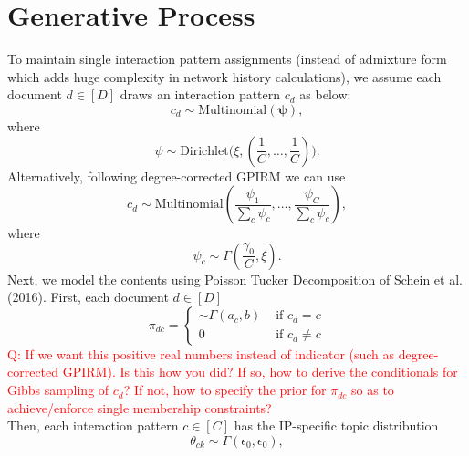 \documentclass[11pt]{article}
\begin{document}
\maketitle


\section{Generative Process}
To maintain single interaction pattern assignments (instead of admixture form which adds huge complexity in network history calculations), we assume each document $d \in [D]$ draws an interaction pattern $c_d$ as below:
\begin{equation}
c_d\sim \mbox{Multinomial}(\boldsymbol{\psi}),
\end{equation}
where 
\begin{equation}
\psi \sim \mbox{Dirichlet}\Big(\xi, (\frac{1}{C},\ldots,\frac{1}{C})\Big).
\end{equation}
Alternatively, following degree-corrected GPIRM we can use
\begin{equation}
c_d\sim \mbox{Multinomial}(\frac{\psi_1}{\sum_c \psi_c},\ldots,\frac{\psi_C}{\sum_c \psi_c}),
\end{equation}
where 
\begin{equation}
\psi_c\sim \Gamma(\frac{\gamma_0}{C}, \xi).
\end{equation}
Next, we model the contents using Poisson Tucker Decomposition of Schein et al. (2016). First, each document $d \in [D]$
\begin{equation}
\pi_{dc}=
\begin{cases}
 \sim \Gamma(a_c, b)&\mbox{ if } c_d = c\\
 0&\mbox{ if } c_d \neq c
\end{cases}
\end{equation}
\textcolor{red}{Q: If we want this positive real numbers instead of indicator (such as degree-corrected GPIRM). Is this how you did? If so, how to derive
	the conditionals for Gibbs sampling of $c_d$? If not, how to specify the prior for $\pi_{dc}$ so as to achieve/enforce single membership constraints? }\\\newline
Then, each interaction pattern $c \in [C]$ has the IP-specific topic distribution
\begin{equation}
\theta_{ck} \sim  \Gamma(\epsilon_0,\epsilon_0),
\end{equation}
\end{document}
